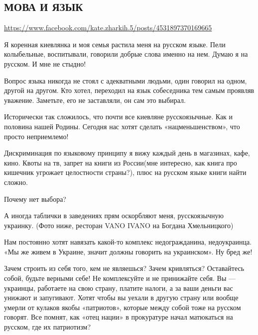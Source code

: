  
 
 
 
 

\subsection{МОВА И ЯЗЫК}
\label{sec:18_06_2020.fb.zharkih_ekaterina.1.mova_jazyk}
\url{https://www.facebook.com/kate.zharkih.5/posts/4531897370169665}

Я коренная киевлянка и моя семья растила меня на русском языке. Пели
колыбельные, воспитывали, говорили добрые слова именно на нем. Думаю я на
русском. И мне не стыдно!

Вопрос языка никогда не стоял с адекватными людьми, один говорил на одном,
другой на другом. Кто хотел, переходил на язык собеседника тем самым проявляв
уважение. Заметьте, его не заставляли, он сам это выбирал.

Исторически так сложилось, что почти все киевляне русскоязычные. Как и половина
нашей Родины. Сегодня нас хотят сделать «нацменьшенством», что просто
неприемлемо!

Дискриминация по языковому принципу я вижу каждый день в магазинах, кафе, кино.
Квоты на тв, запрет на книги из России(мне интересно, как книга про кишечник
угрожает целостности страны?), плюс на русском языке книги найти сложно.

Почему нет выбора?

А иногда таблички в заведениях прям оскорбляют меня, русскоязычную украинку.
(Фото ниже, ресторан VANO IVANO на Богдана Хмельницкого)

Нам постоянно хотят навязать какой-то комплекс недогражданина, недоукраинца.
«Мы же живем в Украине, значит должны говорить на украинском». Ну бред же!

Зачем строить из себя того, кем не являешься? Зачем кривляться? Оставайтесь
собой, будьте верными себе! Не комплексуйте и не принижайте себя. Вы —
украинцы, работаете на свою страну, платите налоги, а за ваши деньги вас
унижают и запугивают. Хотят чтобы вы уехали в другую страну или вообще умерли
от кулаков якобы «патриотов», которые между собой тоже на русском говорят. Все
помнят, как «отец нации» в прокуратуре начал матюкаться на русском, где их
патриотизм?

